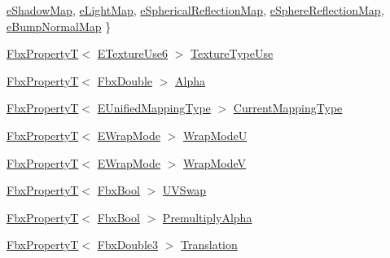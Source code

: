 \begin{DoxyCompactItemize}
\hyperlink{class_fbx_texture_af034d10e711237dd9ae92a5965787f25ae2b54050d51c9cce0d57aa54c68739b5}{e\+Shadow\+Map}, 
\hyperlink{class_fbx_texture_af034d10e711237dd9ae92a5965787f25a6132bbc5c6f65049732f9df322274a9a}{e\+Light\+Map}, 
\hyperlink{class_fbx_texture_af034d10e711237dd9ae92a5965787f25ace2a5aa4cf08e8c8da5375e6e18d9226}{e\+Spherical\+Reflection\+Map}, 
\newline
\hyperlink{class_fbx_texture_af034d10e711237dd9ae92a5965787f25a7d2c4e2d0ea3a3fc04316fea58173f8b}{e\+Sphere\+Reflection\+Map}, 
\hyperlink{class_fbx_texture_af034d10e711237dd9ae92a5965787f25a7131fd3111db906c4242f2009191344e}{e\+Bump\+Normal\+Map}
 \}
\item 
\hyperlink{class_fbx_property_t}{Fbx\+PropertyT}$<$ \hyperlink{class_fbx_texture_a321c489f8a8a5294298ffbf0ed361db9}{E\+Texture\+Use6} $>$ \hyperlink{class_fbx_texture_a4813ec19bc568f47011cc1ce6c71f39e}{Texture\+Type\+Use}
\item 
\hyperlink{class_fbx_property_t}{Fbx\+PropertyT}$<$ \hyperlink{fbxtypes_8h_a171e72a1c46fc15c1a6c9c31948c1c5b}{Fbx\+Double} $>$ \hyperlink{class_fbx_texture_a7248e3e31a2739d23c46a1c1a60fd801}{Alpha}
\item 
\hyperlink{class_fbx_property_t}{Fbx\+PropertyT}$<$ \hyperlink{class_fbx_texture_a66649699e6cdfe32a40284ed8e1faad3}{E\+Unified\+Mapping\+Type} $>$ \hyperlink{class_fbx_texture_a128209af76f914e38438ba56879c0d5c}{Current\+Mapping\+Type}
\item 
\hyperlink{class_fbx_property_t}{Fbx\+PropertyT}$<$ \hyperlink{class_fbx_texture_ae273dffe3ff532dfd57e7bdb15b121fd}{E\+Wrap\+Mode} $>$ \hyperlink{class_fbx_texture_a0bc6524ab7ff1287b95ef46147660d7a}{Wrap\+ModeU}
\item 
\hyperlink{class_fbx_property_t}{Fbx\+PropertyT}$<$ \hyperlink{class_fbx_texture_ae273dffe3ff532dfd57e7bdb15b121fd}{E\+Wrap\+Mode} $>$ \hyperlink{class_fbx_texture_ae829c86b14a0bf8168d4997f5fd729ce}{Wrap\+ModeV}
\item 
\hyperlink{class_fbx_property_t}{Fbx\+PropertyT}$<$ \hyperlink{fbxtypes_8h_a92e0562b2fe33e76a242f498b362262e}{Fbx\+Bool} $>$ \hyperlink{class_fbx_texture_a8c14f57534caca44296248db850db26e}{U\+V\+Swap}
\item 
\hyperlink{class_fbx_property_t}{Fbx\+PropertyT}$<$ \hyperlink{fbxtypes_8h_a92e0562b2fe33e76a242f498b362262e}{Fbx\+Bool} $>$ \hyperlink{class_fbx_texture_a1acbc324c1df7d407aaccf0b3f151d29}{Premultiply\+Alpha}
\item 
\hyperlink{class_fbx_property_t}{Fbx\+PropertyT}$<$ \hyperlink{fbxtypes_8h_ae0a96f14cde566774c7553aa7523b7a7}{Fbx\+Double3} $>$ \hyperlink{class_fbx_texture_a94d73d8c789b8717b32ad5bba86ac42f}{Translation}

\end{DoxyCompactItemize}
